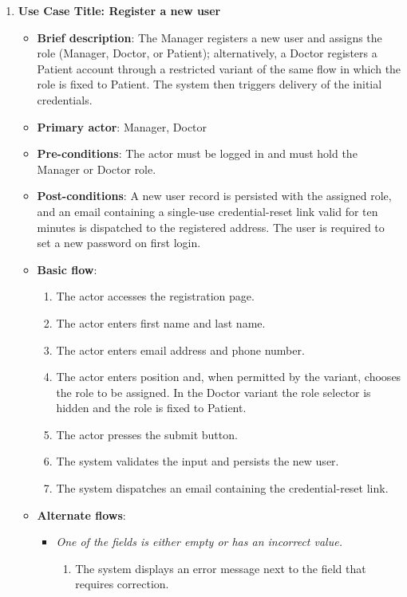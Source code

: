 \begin{enumerate}
\vspace{0.5em}

\item \textbf{Use Case Title: Register a new user}
\begin{itemize}
    \item \textbf{Brief description}: The Manager registers a new user and assigns the role (Manager, Doctor, or Patient); alternatively, a Doctor registers a Patient account through a restricted variant of the same flow in which the role is fixed to Patient. The system then triggers delivery of the initial credentials.
    \item \textbf{Primary actor}: Manager, Doctor
    \item \textbf{Pre-conditions}: The actor must be logged in and must hold the Manager or Doctor role.
    \item \textbf{Post-conditions}: A new user record is persisted with the assigned role, and an email containing a single-use credential-reset link valid for ten minutes is dispatched to the registered address. The user is required to set a new password on first login.
    \item \textbf{Basic flow}:
    \begin{enumerate}
        \item The actor accesses the registration page.
        \item The actor enters first name and last name.
        \item The actor enters email address and phone number.
        \item The actor enters position and, when permitted by the variant, chooses the role to be assigned. In the Doctor variant the role selector is hidden and the role is fixed to Patient.
        \item The actor presses the submit button.
        \item The system validates the input and persists the new user.
        \item The system dispatches an email containing the credential-reset link.
    \end{enumerate}
    \item \textbf{Alternate flows}:
    \begin{itemize}
        \item[6a.] \textit{One of the fields is either empty or has an incorrect value.}
        \begin{enumerate}
            \item The system displays an error message next to the field that requires correction.

\end{enumerate}
\end{itemize}
\end{itemize}
\end{enumerate}
